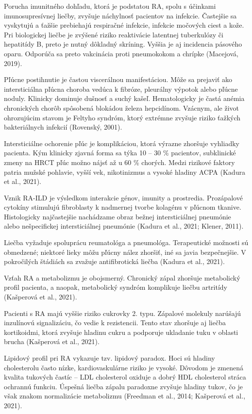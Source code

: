 Porucha imunitného dohľadu, ktorá je podstatou RA, spolu s účinkami imunosupresívnej liečby, zvyšuje náchylnosť pacientov na infekcie. Častejšie sa vyskytujú a ťažšie prebiehajú respiračné infekcie, infekcie močových ciest a kože. Pri biologickej liečbe je zvýšené riziko reaktivácie latentnej tuberkulózy či hepatitídy B, preto je nutný dôkladný skríning. Vyššia je aj incidencia pásového oparu. Odporúča sa preto vakcinácia proti pneumokokom a chrípke (Macejová, 2019). 

Pľúcne postihnutie je častou viscerálnou manifestáciou. Môže sa prejaviť ako intersticiálna pľúcna choroba vedúca k fibróze, pleurálny výpotok alebo pľúcne noduly. Klinicky dominuje dušnosť a suchý kašeľ. Hematologicky je častá anémia chronických chorôb spôsobená blokádou železa hepcidínom. Vzácnym, ale život ohrozujúcim stavom je Feltyho syndróm, ktorý extrémne zvyšuje riziko ťažkých bakteriálnych infekcií (Rovenský, 2001). 

Intersticiálne ochorenie pľúc je komplikáciou, ktorá výrazne zhoršuje vyhliadky pacienta. Kým klinicky zjavná forma sa týka 10 – 30 \% pacientov, subklinické zmeny na HRCT pľúc možno nájsť až u 60 \% chorých. Medzi rizikové faktory patria mužské pohlavie, vyšší vek, nikotinizmus a vysoké hladiny ACPA (Kadura et al., 2021). 

Vznik RA-ILD je výsledkom interakcie génov, imunity a prostredia. Prozápalové cytokíny stimulujú fibroblasty k nadmernej tvorbe kolagénu v pľúcnom tkanive. Histologicky najčastejšie nachádzame obraz bežnej intersticiálnej pneumónie alebo nešpecifickej intersticiálnej pneumónie (Kadura et al., 2021; Klener, 2011). 

Liečba vyžaduje spoluprácu reumatológa a pneumológa. Terapeutické možnosti sú obmedzené; niektoré lieky môžu pľúcny nález zhoršiť, iné sa javia bezpečnejšie. V pokročilých štádiách sa zvažuje antifibrotická liečba (Kadura et al., 2021). 

Vzťah RA a metabolizmu je obojsmerný. Chronický zápal zhoršuje metabolický profil pacienta, a naopak, metabolický syndróm komplikuje liečbu artritídy (Kašperová et al., 2021). 

Pacienti s RA majú vyššie riziko cukrovky 2. typu. Zápalové molekuly narúšajú inzulínovú signalizáciu, čo vedie k rezistencii. Tento stav zhoršuje aj liečba kortikoidmi, ktorá zvyšuje hladinu cukru a podporuje ukladanie tuku v oblasti brucha (Kašperová et al., 2021). 

Lipidový profil pri RA vykazuje tzv. lipidový paradox. Hoci sú hladiny cholesterolu často nízke, kardiovaskulárne riziko je vysoké. Dôvodom je zmenená kvalita tukových častíc – LDL cholesterol oxiduje a dobrý HDL cholesterol stráca ochrannú funkciu. Úspešná liečba zápalu paradoxne zvyšuje hladiny tukov, čo je však znakom normalizácie metabolizmu (Freedman et al., 2014; Kašperová et al., 2021). 

